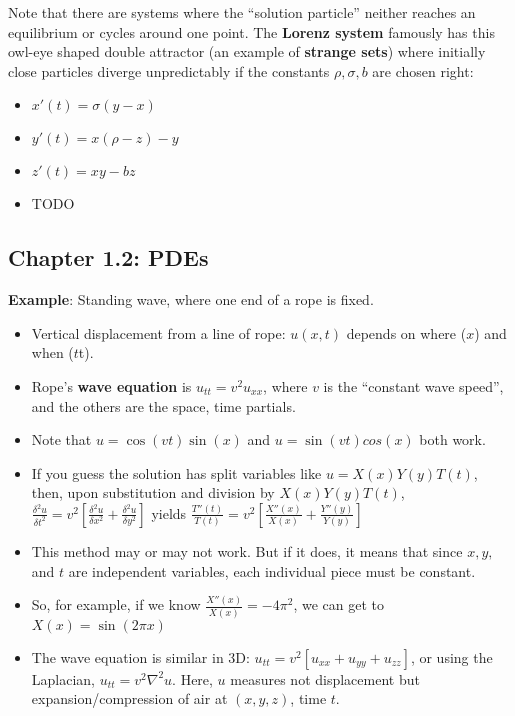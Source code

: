 \documentclass[11pt, oneside]{article}   	%
\begin{document}
Note that there are systems where the ``solution particle'' neither reaches an equilibrium or cycles around one point.  The \textbf{Lorenz system} famously has this owl-eye shaped double attractor (an example of \textbf{strange sets}) where initially close particles diverge unpredictably if the constants $\rho, \sigma, b$ are chosen right:

\begin{itemize}
\item $x'(t) = \sigma(y-x)$
\item $y'(t) = x(\rho - z) - y$
\item $z'(t) = xy-bz$
\end{itemize}

\begin{itemize}
\item TODO
\end{itemize}

\subsection{Chapter 1.2: PDEs}

\textbf{Example}: Standing wave, where one end of a rope is fixed.  
\begin{itemize}
\item Vertical displacement from a line of rope: $u(x,t)$ depends on where ($x$) and when ($t$t).
\item Rope's \textbf{wave equation} is $u_{tt} = v^2u_{xx}$, where $v$ is the ``constant wave speed'', and the others are the space, time partials.
\item Note that $u = \cos(vt)\sin(x)$ and $u = \sin(vt)cos(x)$ both work.
\item If you guess the solution has split variables like $u = X(x)Y(y)T(t)$, then, upon substitution and division by $X(x)Y(y)T(t)$, $\frac{\delta^2 u}{\delta t^2} = v^2 [\frac{\delta^2 u}{\delta x^2} + \frac{\delta^2 u}{\delta y^2}]$ yields $\frac{T''(t)}{T(t)} = v^2 [\frac{X''(x)}{X(x)} + \frac{Y''(y)}{Y(y)} ]$
\item This method may or may not work.  But if it does, it means that since $x, y, $ and $t$ are independent variables, each individual piece must be constant.
\item So, for example, if we know $\frac{X''(x)}{X(x)} = -4\pi^2$, we can get to $X(x) = \sin(2\pi x)$
\item The wave equation is similar in 3D: $u_{tt} = v^2[u_{xx}+u_{yy}+u_{zz}]$, or using the Laplacian, $u_{tt} = v^2\nabla^2 u$.  Here, $u$ measures not displacement but expansion/compression of air at $(x,y,z)$, time $t$.
\end{itemize}
\end{document}
